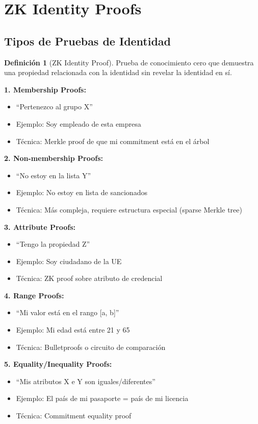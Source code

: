 \documentclass[11pt,a4paper,twoside]{book}
\theoremstyle{definition}
\newtheorem{definition}{Definición}[chapter]
\theoremstyle{remark}
\begin{document}
\section{ZK Identity Proofs}
\label{sec:zk-identity-proofs}

\subsection{Tipos de Pruebas de Identidad}

\begin{definition}[ZK Identity Proof]
Prueba de conocimiento cero que demuestra una propiedad relacionada con la identidad sin revelar la identidad en sí.
\end{definition}

\begin{mathnote}
\textbf{1. Membership Proofs:}
\begin{itemize}
    \item ``Pertenezco al grupo X''
    \item Ejemplo: Soy empleado de esta empresa
    \item Técnica: Merkle proof de que mi commitment está en el árbol
\end{itemize}

\textbf{2. Non-membership Proofs:}
\begin{itemize}
    \item ``No estoy en la lista Y''
    \item Ejemplo: No estoy en lista de sancionados
    \item Técnica: Más compleja, requiere estructura especial (sparse Merkle tree)
\end{itemize}

\textbf{3. Attribute Proofs:}
\begin{itemize}
    \item ``Tengo la propiedad Z''
    \item Ejemplo: Soy ciudadano de la UE
    \item Técnica: ZK proof sobre atributo de credencial
\end{itemize}

\textbf{4. Range Proofs:}
\begin{itemize}
    \item ``Mi valor está en el rango [a, b]''
    \item Ejemplo: Mi edad está entre 21 y 65
    \item Técnica: Bulletproofs o circuito de comparación
\end{itemize}

\textbf{5. Equality/Inequality Proofs:}
\begin{itemize}
    \item ``Mis atributos X e Y son iguales/diferentes''
    \item Ejemplo: El país de mi pasaporte = país de mi licencia
    \item Técnica: Commitment equality proof
\end{itemize}
\end{mathnote}
\end{document}
